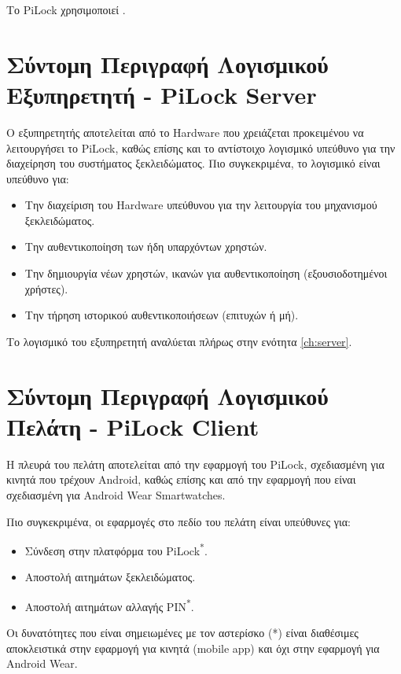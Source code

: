 \label{ch:structure}
Το PiLock χρησιμοποιεί .

\section{Σύντομη Περιγραφή Λογισμικού Εξυπηρετητή - PiLock Server}
	Ο εξυπηρετητής αποτελείται από το Hardware που χρειάζεται προκειμένου να λειτουργήσει το PiLock, καθώς επίσης και το αντίστοιχο λογισμικό υπεύθυνο για την διαχείρηση του συστήματος ξεκλειδώματος. Πιο συγκεκριμένα, το λογισμικό είναι υπεύθυνο για:
	\begin{itemize}
		\item Την διαχείριση του Hardware υπεύθυνου για την λειτουργία του μηχανισμού ξεκλειδώματος.
		\item Την αυθεντικοποίηση των ήδη υπαρχόντων χρηστών.
		\item Την δημιουργία νέων χρηστών, ικανών για αυθεντικοποίηση (εξουσιοδοτημένοι χρήστες).
		\item Την τήρηση ιστορικού αυθεντικοποιήσεων (επιτυχών ή μή).
	\end{itemize}
	Το λογισμικό του εξυπηρετητή αναλύεται πλήρως στην ενότητα \ref{ch:server}. %

\section{Σύντομη Περιγραφή Λογισμικού Πελάτη - PiLock Client}
	\label{sec:pilock_client_overview}
	Η πλευρά του πελάτη αποτελείται από την εφαρμογή του PiLock, σχεδιασμένη για κινητά που τρέχουν Android, καθώς επίσης και από την εφαρμογή που είναι σχεδιασμένη για Android Wear Smartwatches.

	Πιο συγκεκριμένα, οι εφαρμογές στο πεδίο του πελάτη είναι υπεύθυνες για:

	\begin{itemize}
		\item Σύνδεση στην πλατφόρμα του PiLock\textsuperscript{*}.
		\item Αποστολή αιτημάτων ξεκλειδώματος.
		\item Αποστολή αιτημάτων αλλαγής PIN\textsuperscript{*}.
	\end{itemize}
	{\footnotesize Οι δυνατότητες που είναι σημειωμένες με τον αστερίσκο (*) είναι διαθέσιμες αποκλειστικά στην εφαρμογή για κινητά (mobile app) και όχι στην εφαρμογή για Android Wear.}

